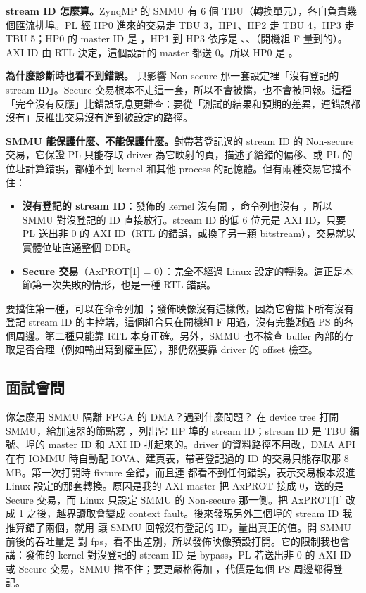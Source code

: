 \textbf{stream ID 怎麼算。}ZynqMP 的 SMMU 有 6 個 TBU（轉換單元），各自負責幾個匯流排埠。PL 經 HP0 進來的交易走 TBU 3，HP1、HP2 走 TBU 4，HP3 走 TBU 5；HP0 的 master ID 是 ，HP1 到 HP3 依序是 、、（開機組 F 量到的）。AXI ID 由 RTL 決定，這個設計的 master 都送 0。所以 HP0 是 。

\textbf{為什麼診斷時也看不到錯誤。} 只影響 Non-secure 那一套設定裡「沒有登記的 stream ID」。Secure 交易根本不走這一套，所以不會被擋，也不會被回報。這種「完全沒有反應」比錯誤訊息更難查：要從「測試的結果和預期的差異，連錯誤都沒有」反推出交易沒有進到被設定的路徑。

\textbf{SMMU 能保護什麼、不能保護什麼。}對帶著登記過的 stream ID 的 Non-secure 交易，它保證 PL 只能存取 driver 為它映射的頁，描述子給錯的偏移、或 PL 的位址計算錯誤，都碰不到 kernel 和其他 process 的記憶體。但有兩種交易它擋不住：
\begin{itemize}
\item \textbf{沒有登記的 stream ID}：發佈的 kernel 沒有開 ，命令列也沒有 ，所以 SMMU 對沒登記的 ID 直接放行。stream ID 的低 6 位元是 AXI ID，只要 PL 送出非 0 的 AXI ID（RTL 的錯誤，或換了另一顆 bitstream），交易就以實體位址直通整個 DDR。
\item \textbf{Secure 交易}（AxPROT[1] = 0）：完全不經過 Linux 設定的轉換。這正是本節第一次失敗的情形，也是一種 RTL 錯誤。
\end{itemize}
要擋住第一種，可以在命令列加 ；發佈映像沒有這樣做，因為它會擋下所有沒有登記 stream ID 的主控端，這個組合只在開機組 F 用過，沒有完整測過 PS 的各個周邊。第二種只能靠 RTL 本身正確。另外，SMMU 也不檢查 buffer 內部的存取是否合理（例如輸出寫到權重區），那仍然要靠 driver 的 offset 檢查。

\subsection{面試會問}

\begin{qa}{你怎麼用 SMMU 隔離 FPGA 的 DMA？遇到什麼問題？}
在 device tree 打開 SMMU，給加速器的節點寫 ，列出它 HP 埠的 stream ID；stream ID 是 TBU 編號、埠的 master ID 和 AXI ID 拼起來的。driver 的資料路徑不用改，DMA API 在有 IOMMU 時自動配 IOVA、建頁表，帶著登記過的 ID 的交易只能存取那 8 MB。第一次打開時 fixture 全錯，而且連  都看不到任何錯誤，表示交易根本沒進 Linux 設定的那套轉換。原因是我的 AXI master 把 AxPROT 接成 0，送的是 Secure 交易，而 Linux 只設定 SMMU 的 Non-secure 那一側。把 AxPROT[1] 改成 1 之後，越界讀取會變成 context fault。後來發現另外三個埠的 stream ID 我推算錯了兩個，就用  讓 SMMU 回報沒有登記的 ID，量出真正的值。開 SMMU 前後的吞吐量是 \smmuOnFps{} 對 \smmuOffFps{} fps，看不出差別，所以發佈映像預設打開。它的限制我也會講：發佈的 kernel 對沒登記的 stream ID 是 bypass，PL 若送出非 0 的 AXI ID 或 Secure 交易，SMMU 擋不住；要更嚴格得加 ，代價是每個 PS 周邊都得登記。
\end{qa}

